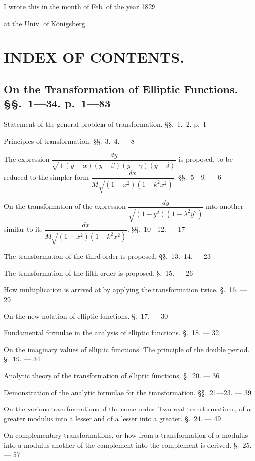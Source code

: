 \documentclass{article}
\begin{document}
I wrote this in the month of Feb. of the year 1829

at the Univ. of Königsberg.


\section*{INDEX OF CONTENTS.}

\subsection*{On the Transformation of Elliptic Functions. §§.\ 1---34. p.\ 1---83}

Statement of the general problem of transformation. §§.\ 1.\ 2. p.\ 1

Principles of transformation. §§.\ 3.\ 4. --- 8

The expression $\dfrac{dy}{\sqrt{\pm(y-\alpha)(y-\beta)(y-\gamma)(y-\delta)}}$ is proposed, to be reduced to the simpler form $\dfrac{dx}{M\sqrt{(1-x^{2})(1-k^{2}x^{2})}}$. §§.\ 5---9. --- 6

On the transformation of the expression $\dfrac{dy}{\sqrt{(1-y^{2})(1-\lambda^{2}y^{2})}}$ into another similar to it, $\dfrac{dx}{M\sqrt{(1-x^{2})(1-k^{2}x^{2})}}$. §§.\ 10---12. --- 17

The transformation of the third order is proposed. §§.\ 13.\ 14. --- 23

The transformation of the fifth order is proposed. §.\ 15. --- 26

How multiplication is arrived at by applying the transformation twice. §.\ 16. --- 29

On the new notation of elliptic functions. §.\ 17. --- 30

Fundamental formulae in the analysis of elliptic functions. §.\ 18. --- 32

On the imaginary values of elliptic functions. The principle of the double period. §.\ 19. --- 34

Analytic theory of the transformation of elliptic functions. §.\ 20. --- 36

Demonstration of the analytic formulae for the transformation. §§.\ 21---23. --- 39

On the various transformations of the same order. Two real transformations, of a greater modulus into a lesser and of a lesser into a greater. §.\ 24. --- 49

On complementary transformations, or how from a transformation of a modulus into a modulus another of the complement into the complement is derived. §.\ 25. --- 57
\end{document}

